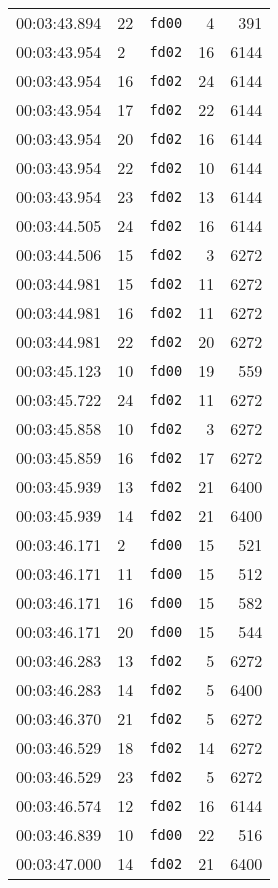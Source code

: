 \documentclass{article}
\begin{document}
\begin{longtable}{lllrr}
00:03:43.894 & 22 & \texttt{fd00} & 4 & 391 \\
00:03:43.954 & 2 & \texttt{fd02} & 16 & 6144 \\
00:03:43.954 & 16 & \texttt{fd02} & 24 & 6144 \\
00:03:43.954 & 17 & \texttt{fd02} & 22 & 6144 \\
00:03:43.954 & 20 & \texttt{fd02} & 16 & 6144 \\
00:03:43.954 & 22 & \texttt{fd02} & 10 & 6144 \\
00:03:43.954 & 23 & \texttt{fd02} & 13 & 6144 \\
00:03:44.505 & 24 & \texttt{fd02} & 16 & 6144 \\
00:03:44.506 & 15 & \texttt{fd02} & 3 & 6272 \\
00:03:44.981 & 15 & \texttt{fd02} & 11 & 6272 \\
00:03:44.981 & 16 & \texttt{fd02} & 11 & 6272 \\
00:03:44.981 & 22 & \texttt{fd02} & 20 & 6272 \\
00:03:45.123 & 10 & \texttt{fd00} & 19 & 559 \\
00:03:45.722 & 24 & \texttt{fd02} & 11 & 6272 \\
00:03:45.858 & 10 & \texttt{fd02} & 3 & 6272 \\
00:03:45.859 & 16 & \texttt{fd02} & 17 & 6272 \\
00:03:45.939 & 13 & \texttt{fd02} & 21 & 6400 \\
00:03:45.939 & 14 & \texttt{fd02} & 21 & 6400 \\
00:03:46.171 & 2 & \texttt{fd00} & 15 & 521 \\
00:03:46.171 & 11 & \texttt{fd00} & 15 & 512 \\
00:03:46.171 & 16 & \texttt{fd00} & 15 & 582 \\
00:03:46.171 & 20 & \texttt{fd00} & 15 & 544 \\
00:03:46.283 & 13 & \texttt{fd02} & 5 & 6272 \\
00:03:46.283 & 14 & \texttt{fd02} & 5 & 6400 \\
00:03:46.370 & 21 & \texttt{fd02} & 5 & 6272 \\
00:03:46.529 & 18 & \texttt{fd02} & 14 & 6272 \\
00:03:46.529 & 23 & \texttt{fd02} & 5 & 6272 \\
00:03:46.574 & 12 & \texttt{fd02} & 16 & 6144 \\
00:03:46.839 & 10 & \texttt{fd00} & 22 & 516 \\
00:03:47.000 & 14 & \texttt{fd02} & 21 & 6400 \\

\end{longtable}
\end{document}
